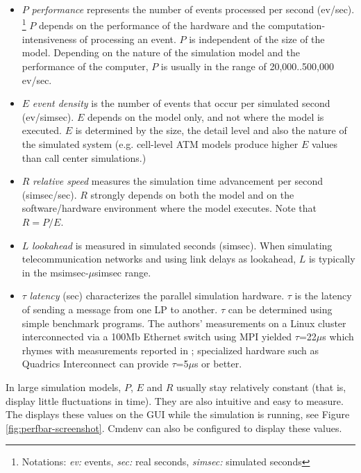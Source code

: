 \begin{itemize}
  \item{$P$ \textit{performance} represents the number of events processed per
    second (ev/sec).
       \footnote{Notations: \textit{ev:} events, \textit{sec:} real seconds,
       \textit{simsec:} simulated seconds}
    $P$ depends on the performance of the hardware and the computation-intensiveness
    of processing an event. $P$ is independent of the size of the model.
    Depending on the nature of the simulation model and the performance of the
    computer, $P$ is usually in the range of 20,000..500,000 ev/sec.}
  \item{$E$ \textit{event density} is the number of events that occur per
    simulated second (ev/simsec). $E$ depends on the model only, and not
    where the model is executed. $E$ is determined by the size, the detail level
    and also the nature of the simulated system (e.g. cell-level ATM models
    produce higher $E$ values than call center simulations.)}
  \item{$R$ \textit{relative speed} measures the simulation time advancement
    per second (simsec/sec). $R$ strongly depends on both the model and
    on the software/hardware environment where the model executes.
    Note that $R = P/E$.}
  \item{$L$ \textit{lookahead} is measured in simulated seconds (simsec).
    When simulating telecommunication networks and using link delays as
    lookahead, $L$ is typically in the msimsec-$\mu$simsec range.}
  \item{$\tau$ \textit{latency} (sec) characterizes the parallel simulation hardware.
    $\tau$ is the latency of sending a message from one LP to another. $\tau$
    can be determined using simple benchmark programs. The authors' measurements
    on a Linux cluster interconnected via a 100Mb Ethernet switch using MPI
    yielded $\tau$=22$\mu$s which rhymes with measurements reported
    in \cite{ongfarrell2000}; specialized hardware such as
    Quadrics Interconnect \cite{quadrics} can provide $\tau$=5$\mu$s or better.}
\end{itemize}

In large simulation models, $P$, $E$ and $R$ usually stay relatively constant
(that is, display little fluctuations in time). They are also intuitive and
easy to measure. The {\opp} displays these values on the GUI while the simulation
is running, see Figure \ref{fig:perfbar-screenshot}. Cmdenv can also be configured
to display these values.

